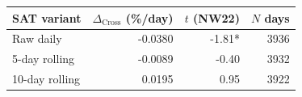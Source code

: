 \begin{tabular}{lrrr}
\toprule
SAT variant & $\Delta_\text{Cross}$ (\%/day) & $t$ (NW22) & $N$ days \\
\midrule
Raw daily & -0.0380 & -1.81* & 3936 \\
5-day rolling & -0.0089 & -0.40 & 3932 \\
10-day rolling & 0.0195 & 0.95 & 3922 \\
\bottomrule
\end{tabular}